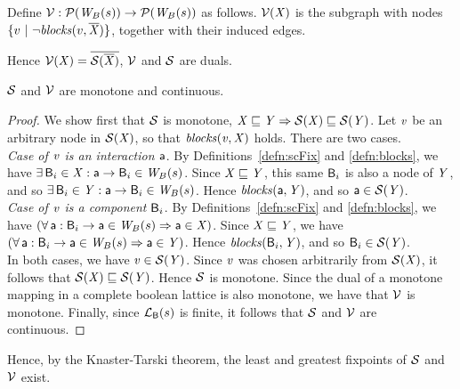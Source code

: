 \begin{definition}[$\VFs$]  \label{defn:violFix}
Define $\mathcal{V}: \mathcal{P}(\mathit{W}_{B}({s})) \to \mathcal{P}(\mathit{W}_{B}({s}))$ as follows.
$\mathcal{V}(\mathit{X})$ is the subgraph with nodes ${\{ v ~|~ \neg \mathit{blocks}(v, \overline{\mathit{\mathit{X}}}) \}}$, together with their induced edges.
\end{definition}
%
Hence $\mathcal{V}(\mathit{X}) = \overline{\mathcal{S}(\overline{\mathit{X}})}$, \ie $\VFs$ and $\mathcal{S}$ are duals.

\begin{proposition} \label{prop:monotone}
$\mathcal{S}$ and $\VFs$ are monotone and continuous.
\end{proposition}
%
\begin{proof}
We show first that $\mathcal{S}$ is monotone, \ie $\mathit{X} \sqsubseteq \mathit{Y} \Rightarrow \mathcal{S}(\mathit{X}) \sqsubseteq \mathcal{S}(\mathit{Y})$.
Let $\mathit{v}$ be an arbitrary node in $\mathcal{S}(\mathit{X})$, so that $\mathit{blocks}(\mathit{v}, \mathit{X})$ holds. There are two cases.\\

\emph{Case of $\mathit{v}$ is an interaction $\mathsf{a}$}. By Definitions~\ref{defn:scFix} and \ref{defn:blocks}, we have $\exists\, \mathsf{B}_i \in \mathit{X}  : \mathsf{a} \rightarrow \mathsf{B}_i \in \mathit{W}_{B}({s})$.
Since $\mathit{X} \sqsubseteq \mathit{Y}$, this same $\mathsf{B}_i$ is also a node of $\mathit{Y}$, and so  $\exists\, \mathsf{B}_i \in \mathit{Y}  : \mathsf{a} \rightarrow \mathsf{B}_i \in \mathit{W}_{B}({s})$. 
Hence  $\mathit{blocks}(\mathsf{a}, \mathit{Y})$, and so $\mathsf{a} \in \mathcal{S}(\mathit{Y})$. \\

\emph{Case of $\mathit{v}$ is a component $\mathsf{B}_i$}. By Definitions~\ref{defn:scFix} and \ref{defn:blocks}, we have $(\forall\, \mathsf{a} : \mathsf{B}_i \rightarrow \mathsf{a} \in \mathit{W}_{B}({s}) \Rightarrow \mathsf{a} \in \mathit{X})$.
Since $\mathit{X} \sqsubseteq \mathit{Y}$, we have  $(\forall\, \mathsf{a} : \mathsf{B}_i \rightarrow \mathsf{a} \in \mathit{W}_{B}({s}) \Rightarrow \mathsf{a} \in \mathit{Y})$. 
Hence $\mathit{blocks}(\mathsf{B}_i, \mathit{Y})$, and so $\mathsf{B}_i \in \mathcal{S}(\mathit{Y})$. \\

In both cases, we have $\mathit{v} \in \mathcal{S}(\mathit{Y})$. Since $\mathit{v}$ was chosen arbitrarily from $\mathcal{S}(\mathit{X}) $, it follows that $\mathcal{S}(\mathit{X}) \sqsubseteq \mathcal{S}(\mathit{Y})$. Hence
$\mathcal{S}$ is monotone.
%
Since the dual of a monotone mapping in a complete boolean lattice is also monotone, we have that $\VFs$ is monotone.
%
Finally, since $\mathcal{L}_{\mathsf{B}}({s})$ is finite, it follows that $\mathcal{S}$ and $\VFs$ are continuous.
\end{proof}

Hence, by the Knaster-Tarski theorem, the least and greatest fixpoints of $\mathcal{S}$ and $\VFs$ exist.

